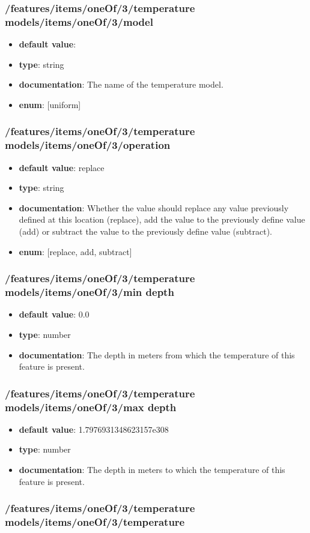 \subsubsection{/features/items/oneOf/3/temperature models/items/oneOf/3/model}
\begin{itemize}\item {\bf default value}: 
\item {\bf type}: string
\item {\bf documentation}: The name of the temperature model.
\item {\bf enum}: [uniform]\end{itemize}\subsubsection{/features/items/oneOf/3/temperature models/items/oneOf/3/operation}
\begin{itemize}\item {\bf default value}: replace
\item {\bf type}: string
\item {\bf documentation}: Whether the value should replace any value previously defined at this location (replace), add the value to the previously define value (add) or subtract the value to the previously define value (subtract).
\item {\bf enum}: [replace, add, subtract]\end{itemize}\subsubsection{/features/items/oneOf/3/temperature models/items/oneOf/3/min depth}
\begin{itemize}\item {\bf default value}: 0.0
\item {\bf type}: number
\item {\bf documentation}: The depth in meters from which the temperature of this feature is present.
\end{itemize}\subsubsection{/features/items/oneOf/3/temperature models/items/oneOf/3/max depth}
\begin{itemize}\item {\bf default value}: 1.7976931348623157e308
\item {\bf type}: number
\item {\bf documentation}: The depth in meters to which the temperature of this feature is present.
\end{itemize}\subsubsection{/features/items/oneOf/3/temperature models/items/oneOf/3/temperature}
